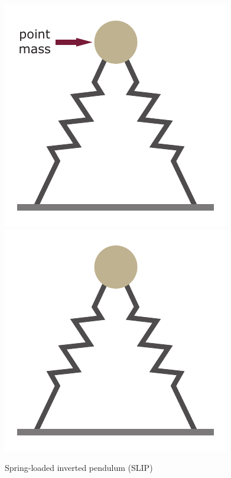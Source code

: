 \documentclass[10pt]{beamer}
\begin{document}
\begin{frame}
\begin{columns}
\begin{figure}
\begin{overprint}
					\includegraphics[width=.9\textwidth]{images/slip/double_SLIP_mass.pdf}
					\onslide<4->\includegraphics[width=.9\textwidth]{images/slip/double_SLIP.pdf}		
				\end{overprint}			
				\caption{Spring-loaded inverted pendulum (SLIP)}
			\end{figure}
			

\end{columns}
\end{frame}
\end{document}
